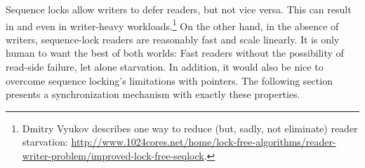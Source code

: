 Sequence locks allow writers to defer readers, but not vice versa.
This can result in  and even 
in writer-heavy workloads.\footnote{
	Dmitry Vyukov describes one way to reduce (but, sadly, not eliminate)
	reader starvation:
	\url{http://www.1024cores.net/home/lock-free-algorithms/reader-writer-problem/improved-lock-free-seqlock}.}
On the other hand, in the absence of writers, sequence-lock readers are
reasonably fast and scale linearly.
It is only human to want the best of both worlds:
Fast readers without the possibility of read-side failure,
let alone starvation.
In addition, it would also be nice to overcome sequence locking's limitations
with pointers.
The following section presents a synchronization mechanism with exactly
these properties.
